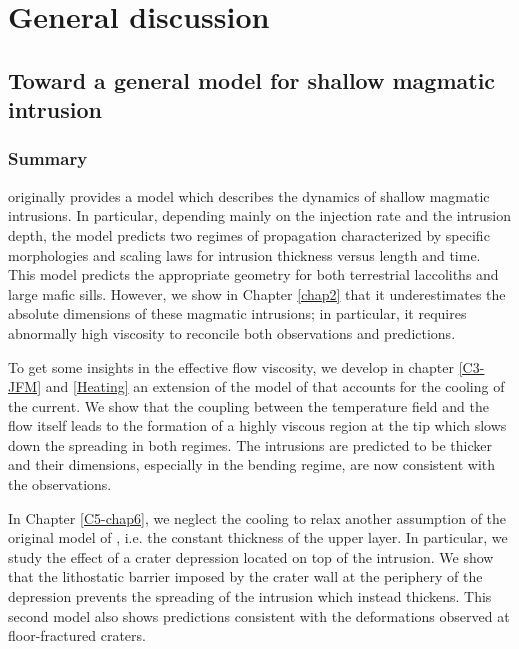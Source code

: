 \chapter{General discussion}
\label{chap9}
\minitoc

\section{Toward a general model for shallow magmatic intrusion}
\label{sec:dynam-shall-magm-1}

\subsection{Summary}
\label{sec:summary-2}

\citet{Michaut:2011kg} originally provides a model which describes the
dynamics  of shallow  magmatic  intrusions.  In particular,  depending
mainly  on the  injection  rate  and the  intrusion  depth, the  model
predicts  two   regimes  of  propagation  characterized   by  specific
morphologies and  scaling laws  for intrusion thickness  versus length
and  time.  This model  predicts  the  appropriate geometry  for  both
terrestrial  laccoliths and  large mafic  sills. However,  we show  in
Chapter \ref{chap2} that it  underestimates the absolute dimensions of
these magmatic intrusions; in  particular, it requires abnormally high
viscosity to reconcile both observations and predictions.

To get  some insights in the  effective flow viscosity, we  develop in
chapter \ref{C3-JFM}  and \ref{Heating} an  extension of the  model of
\citet{Michaut:2011kg} that  accounts for the cooling  of the current.
We show that  the coupling between the temperature field  and the flow
itself leads  to the formation of  a highly viscous region  at the tip
which slows  down the  spreading in both  regimes. The  intrusions are
predicted  to  be thicker  and  their  dimensions, especially  in  the
bending regime, are now consistent with the observations.

In Chapter  \ref{C5-chap6}, we  neglect the  cooling to  relax another
assumption of  the original model of  \citet{Michaut:2011kg}, i.e. the
constant thickness  of the  upper layer. In  particular, we  study the
effect of a crater depression located on top of the intrusion. We show
that  the  lithostatic barrier  imposed  by  the  crater wall  at  the
periphery of  the depression prevents  the spreading of  the intrusion
which  instead  thickens. This  second  model  also shows  predictions
consistent with the deformations observed at floor-fractured craters.

